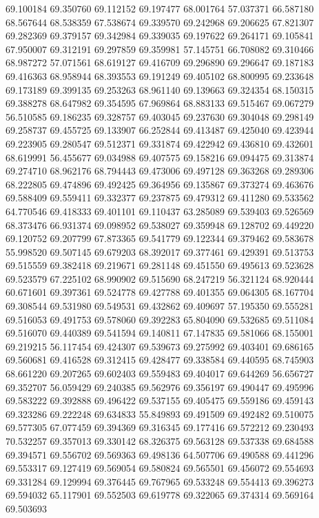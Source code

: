 69.100184
69.350760
69.112152
69.197477
68.001764
57.037371
66.587180
68.567644
68.538359
67.538674
69.339570
69.242968
69.206625
67.821307
69.282369
69.379157
69.342984
69.339035
69.197622
69.264171
69.105841
67.950007
69.312191
69.297859
69.359981
57.145751
66.708082
69.310466
68.987272
57.071561
68.619127
69.416709
69.296890
69.296647
69.187183
69.416363
68.958944
68.393553
69.191249
69.405102
68.800995
69.233648
69.173189
69.399135
69.253263
68.961140
69.139663
69.324354
68.150315
69.388278
68.647982
69.354595
67.969864
68.883133
69.515467
69.067279
56.510585
69.186235
69.328757
69.403045
69.237630
69.304048
69.298149
69.258737
69.455725
69.133907
66.252844
69.413487
69.425040
69.423944
69.223905
69.280547
69.512371
69.331874
69.422942
69.436810
69.432601
68.619991
56.455677
69.034988
69.407575
69.158216
69.094475
69.313874
69.274710
68.962176
68.794443
69.473006
69.497128
69.363268
69.289306
68.222805
69.474896
69.492425
69.364956
69.135867
69.373274
69.463676
69.588409
69.559411
69.332377
69.237875
69.479312
69.411280
69.533562
64.770546
69.418333
69.401101
69.110437
63.285089
69.539403
69.526569
68.373476
66.931374
69.098952
69.538027
69.359948
69.128702
69.449220
69.120752
69.207799
67.873365
69.541779
69.122344
69.379462
69.583678
55.998520
69.507145
69.679203
68.392017
69.377461
69.429391
69.513753
69.515559
69.382418
69.219671
69.281148
69.451550
69.495613
69.523628
69.523579
67.225102
68.990902
69.515690
68.247219
56.321124
68.920444
60.671601
69.397361
69.524778
69.427788
69.401355
69.064305
68.167704
69.308544
69.531980
69.549531
69.432862
69.409697
57.195350
69.555281
69.516053
69.491753
69.578060
69.392283
65.804090
69.532685
69.511084
69.516070
69.440389
69.541594
69.140811
67.147835
69.581066
68.155001
69.219215
56.117454
69.424307
69.539673
69.275992
69.403401
69.686165
69.560681
69.416528
69.312415
69.428477
69.338584
69.440595
68.745903
68.661220
69.207265
69.602403
69.559483
69.404017
69.644269
56.656727
69.352707
56.059429
69.240385
69.562976
69.356197
69.490447
69.495996
69.583222
69.392888
69.496422
69.537155
69.405475
69.559186
69.459143
69.323286
69.222248
69.634833
55.849893
69.491509
69.492482
69.510075
69.577305
67.077459
69.394369
69.316345
69.177416
69.572212
69.230493
70.532257
69.357013
69.330142
68.326375
69.563128
69.537338
69.684588
69.394571
69.556702
69.569363
69.498136
64.507706
69.490588
69.441296
69.553317
69.127419
69.569054
69.580824
69.565501
69.456072
69.554693
69.331284
69.129994
69.376445
69.767965
69.533248
69.554413
69.396273
69.594032
65.117901
69.552503
69.619778
69.322065
69.374314
69.569164
69.503693
